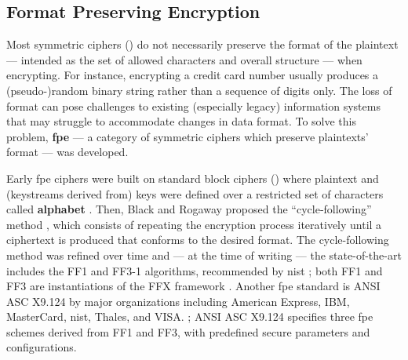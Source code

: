 \subsection{Format Preserving Encryption}\label{sec:symmetric_cryptography:format_preserving}

Most symmetric ciphers () do not necessarily preserve the format of the plaintext --- intended as the set of allowed characters and overall structure --- when encrypting. For instance, encrypting a credit card number usually produces a (pseudo-)random binary string rather than a sequence of digits only. The loss of format can pose challenges to existing (especially legacy) information systems that may struggle to accommodate changes in data format. To solve this problem, \textbf{\gls{fpe}} --- a category of symmetric ciphers which preserve plaintexts' format --- was developed. 

Early \gls{fpe} ciphers were built on standard block ciphers () where plaintext and (keystreams derived from) keys were defined over a restricted set of characters called \textbf{alphabet} \cite{nist_guidelines_1981}. Then, Black and Rogaway proposed the ``cycle‐following'' method \cite{black_ciphers_2002}, which consists of repeating the encryption process iteratively until a ciphertext is produced that conforms to the desired format. The cycle-following method was refined over time and --- at the time of writing --- the state-of-the-art includes the FF1 and FF3-1 algorithms, recommended by \gls{nist} \cite{dworkin_recommendation_2025}; both FF1 and FF3 are instantiations of the FFX framework \cite{bellare_ffx_2010}. Another \gls{fpe} standard is ANSI ASC X9.124 by major organizations including American Express, IBM, MasterCard, \gls{nist}, Thales, and VISA. \cite{ansi_fpe_2023}; ANSI ASC X9.124 specifies three \gls{fpe} schemes derived from FF1 and FF3, with predefined secure parameters and configurations.

